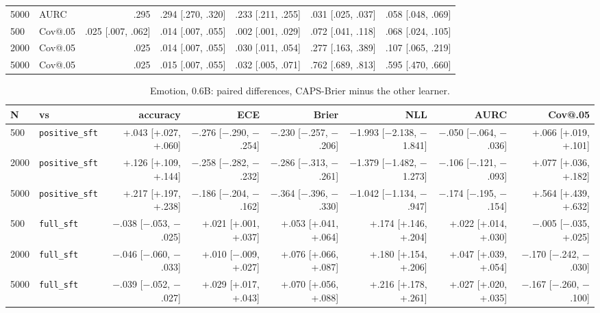 \documentclass[10pt,letterpaper]{article}
\theoremstyle{plain}
\begin{document}
\begin{table}[H]
\begin{adjustbox}{max width=\textwidth}
\begin{tabular}{llrrrrr}
5000 & AURC & .295 & .294 [.270, .320] & .233 [.211, .255] & .031 [.025, .037] & .058 [.048, .069] \\
500 & Cov@.05 & .025 [.007, .062] & .014 [.007, .055] & .002 [.001, .029] & .072 [.041, .118] & .068 [.024, .105] \\
2000 & Cov@.05 & .025 & .014 [.007, .055] & .030 [.011, .054] & .277 [.163, .389] & .107 [.065, .219] \\
5000 & Cov@.05 & .025 & .015 [.007, .055] & .032 [.005, .071] & .762 [.689, .813] & .595 [.470, .660] \\
\bottomrule
\end{tabular}
\end{adjustbox}
\end{table}

\begin{table}[H]
\centering
\footnotesize
\setlength{\tabcolsep}{3pt}
\caption{Emotion, 0.6B: paired differences, CAPS-Brier minus the other learner.}
\label{tab:A7b}
\begin{adjustbox}{max width=\textwidth}
\begin{tabular}{llrrrrrr}
\toprule
N & vs & accuracy & ECE & Brier & NLL & AURC & Cov@.05 \\
\midrule
500 & \texttt{positive\_sft} & +.043 [+.027, +.060] & $-$.276 [$-$.290, $-$.254] & $-$.230 [$-$.257, $-$.206] & $-$1.993 [$-$2.138, $-$1.841] & $-$.050 [$-$.064, $-$.036] & +.066 [+.019, +.101] \\
2000 & \texttt{positive\_sft} & +.126 [+.109, +.144] & $-$.258 [$-$.282, $-$.232] & $-$.286 [$-$.313, $-$.261] & $-$1.379 [$-$1.482, $-$1.273] & $-$.106 [$-$.121, $-$.093] & +.077 [+.036, +.182] \\
5000 & \texttt{positive\_sft} & +.217 [+.197, +.238] & $-$.186 [$-$.204, $-$.162] & $-$.364 [$-$.396, $-$.330] & $-$1.042 [$-$1.134, $-$.947] & $-$.174 [$-$.195, $-$.154] & +.564 [+.439, +.632] \\
500 & \texttt{full\_sft} & $-$.038 [$-$.053, $-$.025] & +.021 [+.001, +.037] & +.053 [+.041, +.064] & +.174 [+.146, +.204] & +.022 [+.014, +.030] & $-$.005 [$-$.035, +.025] \\
2000 & \texttt{full\_sft} & $-$.046 [$-$.060, $-$.033] & +.010 [$-$.009, +.027] & +.076 [+.066, +.087] & +.180 [+.154, +.206] & +.047 [+.039, +.054] & $-$.170 [$-$.242, $-$.030] \\
5000 & \texttt{full\_sft} & $-$.039 [$-$.052, $-$.027] & +.029 [+.017, +.043] & +.070 [+.056, +.088] & +.216 [+.178, +.261] & +.027 [+.020, +.035] & $-$.167 [$-$.260, $-$.100] \\
\bottomrule
\end{tabular}
\end{adjustbox}
\end{table}
\end{document}
